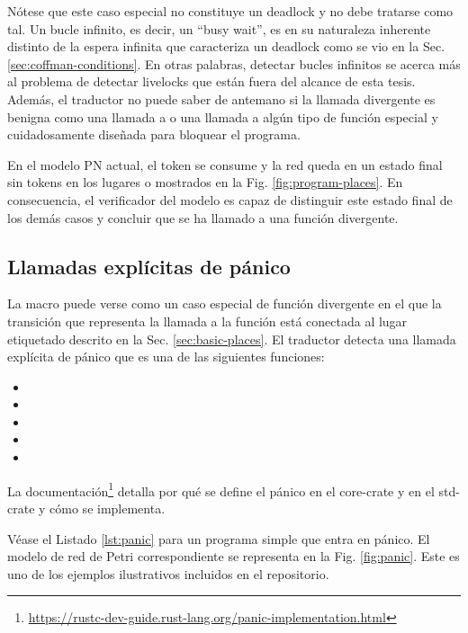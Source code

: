 Nótese que este caso especial no constituye un deadlock y no debe tratarse
como tal. Un bucle infinito, es decir, un ``busy wait'', es en su naturaleza inherente
distinto de la espera infinita que caracteriza un deadlock como se vio en la Sec. \ref{sec:coffman-conditions}.
En otras palabras, detectar bucles infinitos se acerca más al problema de detectar livelocks que
están fuera del alcance de esta tesis. Además, el traductor no puede saber de antemano si la
llamada divergente es benigna como una llamada a  o una llamada a algún
tipo de función especial y cuidadosamente diseñada para bloquear el programa.

En el modelo \acrshort{PN} actual, el token se consume y la red queda en un estado final sin tokens en los
lugares  o  mostrados en la Fig. \ref{fig:program-places}. En consecuencia, el
verificador del modelo es capaz de distinguir este estado final de los demás casos y concluir
que se ha llamado a una función divergente.

\subsection{Llamadas explícitas de pánico}

La macro  puede verse como un caso especial de función divergente en el que la transición que
representa la llamada a la función está conectada al lugar etiquetado  descrito en la Sec.
\ref{sec:basic-places}. El traductor detecta una llamada explícita de pánico que es una de las siguientes funciones:

\begin{itemize}
    \item {}
    \item {}
    \item {}
    \item {}
    \item {}
\end{itemize}

La documentación\footnote{\url{https://rustc-dev-guide.rust-lang.org/panic-implementation.html}}
detalla por qué se define el pánico en el core-crate y en el std-crate y cómo se implementa.

Véase el Listado \ref{lst:panic} para un programa simple que entra en pánico. El modelo de red de Petri
correspondiente se representa en la Fig. \ref{fig:panic}. Este es uno de los ejemplos ilustrativos incluidos
en el repositorio.

